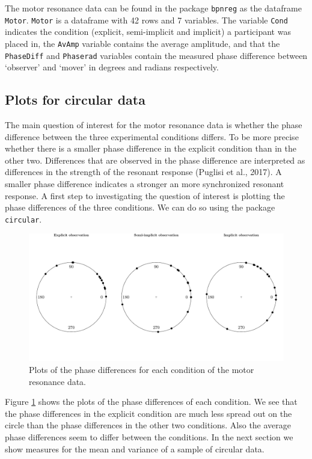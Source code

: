 \documentclass[11pt,]{article}
\begin{document}
The motor resonance data can be found in the package \verb|bpnreg| as
the dataframe \verb|Motor|. \verb|Motor| is a dataframe with 42 rows and
7 variables. The variable \verb|Cond| indicates the condition (explicit,
semi-implicit and implicit) a participant was placed in, the
\verb|AvAmp| variable contains the average amplitude, and that the
\verb|PhaseDiff| and \verb|Phaserad| variables contain the measured
phase difference between `observer' and `mover' in degrees and radians
respectively.

\subsection{Plots for circular data}\label{Plots}

The main question of interest for the motor resonance data is whether
the phase difference between the three experimental conditions differs.
To be more precise whether there is a smaller phase difference in the
explicit condition than in the other two. Differences that are observed
in the phase difference are interpreted as differences in the strength
of the resonant response (Puglisi et al., 2017). A smaller phase
difference indicates a stronger an more synchronized resonant response.
A first step to investigating the question of interest is plotting the
phase differences of the three conditions. We can do so using the
package \verb|circular|.

\begin{figure}
        \centering

\includegraphics[width=\textwidth]{plot_motorresonance.pdf}

         \caption{Plots of the phase differences for each condition of the motor resonance data.}
        \label{motorplot}
\end{figure}

Figure \ref{motorplot} shows the plots of the phase differences of each
condition. We see that the phase differences in the explicit condition
are much less spread out on the circle than the phase differences in the
other two conditions. Also the average phase differences seem to differ
between the conditions. In the next section we show measures for the
mean and variance of a sample of circular data.
\end{document}
